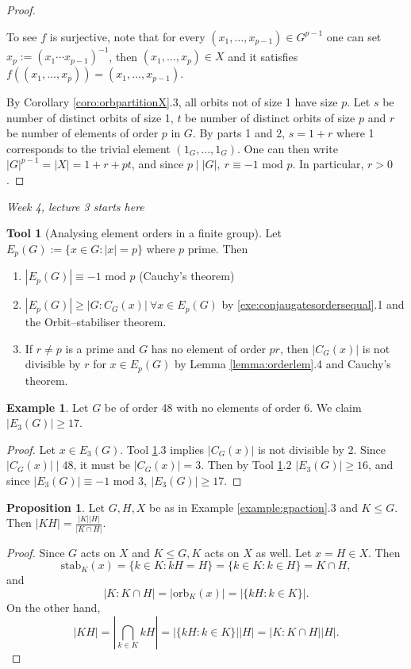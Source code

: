 \documentclass[a4paper]{article}
\newcommand{\orb}{\text{orb}}
\newcommand{\stab}{\text{stab}}
\newcommand{\Mod}{\text{ mod }}
\theoremstyle{definition}
\newtheorem{prop}[defn]{Proposition}
\newtheorem{example}[defn]{Example}
\newtheorem{tool}[defn]{Tool}
\begin{document}
\begin{proof}
\begin{enumerate}
\[\]
To see $f$ is surjective, note that for every $(x_1,\ldots,x_{p-1})\in G^{p-1}$ one can set $x_p:=(x_1\cdots x_{p-1})^{-1}$, then $(x_1,\ldots,x_p)\in X$ and it satisfies $f((x_1,\ldots,x_p))=(x_1,\ldots,x_{p-1})$.
\end{enumerate}
By Corollary \ref{coro:orbpartitionX}.3, all orbits not of size 1 have size $p$. Let $s$ be number of distinct orbits of size 1, $t$ be number of distinct orbits of size $p$ and $r$ be number of elements of order $p$ in $G$. By parts 1 and 2, $s=1+r$ where 1 corresponds to the trivial element $(1_G,\ldots,1_G)$. One can then write $|G|^{p-1}=|X|=1+r+pt$, and since $p\mid |G|,\ r\equiv -1\Mod p$. In particular, $r>0$.
\end{proof}

\begin{flushright}
\textit{Week 4, lecture 3 starts here}
\end{flushright}

\begin{tool}[Analysing element orders in a finite group]
\label{tool:elementorder}
Let $E_p(G):=\{x\in G:|x|=p\}$ where $p$ prime. Then
\begin{enumerate}
\item $|E_p(G)|\equiv -1\Mod p$ (Cauchy's theorem)
\item $|E_p(G)|\geq |G:C_G(x)| \ \forall x\in E_p(G)$ by \ref{exe:conjaugatesordersequal}.1 and the Orbit--stabiliser theorem.
\item If $r\neq p$ is a prime and $G$ has no element of order $pr$, then $|C_G(x)|$ is not divisible by $r$ for $x\in E_p(G)$ by Lemma \ref{lemma:orderlem}.4 and Cauchy's theorem.
\end{enumerate}
\end{tool}

\begin{example}
Let $G$ be of order 48 with no elements of order 6. We claim $|E_3(G)|\geq 17$.
\begin{proof}
Let $x\in E_3(G)$. Tool \ref{tool:elementorder}.3 implies $|C_G(x)|$ is not divisible by 2. Since $|C_G(x)|\mid 48$, it must be $|C_G(x)|=3$. Then by Tool \ref{tool:elementorder}.2 $|E_3(G)|\geq 16$, and since $|E_3(G)|\equiv -1\Mod 3,\ |E_3(G)|\geq 17$.
\end{proof}
\end{example}

\begin{prop}
\label{prop:orderofHK}
Let $G,H,X$ be as in Example \ref{example:gpaction}.3 and $K\leq G$. Then $|KH|=\frac{|K||H|}{|K\cap H|}$.
\end{prop}
\begin{proof}
Since $G$ acts on $X$ and $K\leq G, K$ acts on $X$ as well. Let $x=H\in X$. Then
\[
\stab_K(x)=\{k\in K:kH=H\}=\{k\in K:k\in H\}=K\cap H,
\]
and
\[
|K:K\cap H|=|\orb_K(x)|=|\{kH:k\in K\}|.
\]
On the other hand,
\[
|KH|=\left|\bigcap_{k\in K} kH\right| = |\{kH:k\in K\}||H|=|K:K\cap H||H|.
\]
\end{proof}
\end{document}
